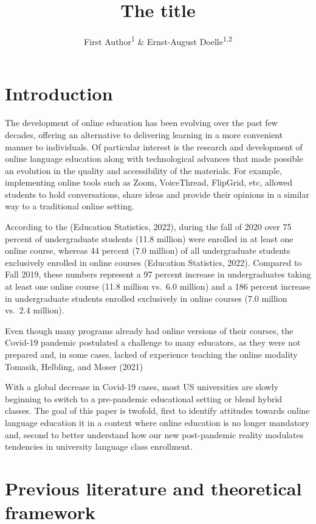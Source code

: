 \documentclass[
  man]{apa6}
\title{The title}
\author{First Author\textsuperscript{1} \& Ernst-August Doelle\textsuperscript{1,2}}
\date{}
\affiliation{\vspace{0.5cm}\textsuperscript{1} Wilhelm-Wundt-University\\\textsuperscript{2} Konstanz Business School}
\begin{document}
\maketitle

\hypertarget{introduction}{%
\section{Introduction}\label{introduction}}

The development of online education has been evolving over the past few decades, offering an alternative to delivering learning in a more convenient manner to individuals.
Of particular interest is the research and development of online language education along with technological advances that made possible an evolution in the quality and accessibility of the materials.
For example, implementing online tools such as Zoom, VoiceThread, FlipGrid, etc, allowed students to hold conversations, share ideas and provide their opinions in a similar way to a traditional online setting.

According to the (Education Statistics, 2022), during the fall of 2020 over 75 percent of undergraduate students (11.8 million) were enrolled in at least one online course, whereas 44 percent (7.0 million) of all undergraduate students exclusively enrolled in online courses (Education Statistics, 2022).
Compared to Fall 2019, these numbers represent a 97 percent increase in undergraduates taking at least one online course (11.8 million vs.~6.0 million) and a 186 percent increase in undergraduate students enrolled exclusively in online courses (7.0 million vs.~2.4 million).

Even though many programs already had online versions of their courses, the Covid-19 pandemic postulated a challenge to many educators, as they were not prepared and, in some cases, lacked of experience teaching the online modality Tomasik, Helbling, and Moser (2021)

With a global decrease in Covid-19 cases, most US universities are slowly beginning to switch to a pre-pandemic educational setting or blend hybrid classes.
The goal of this paper is twofold, first to identify attitudes towards online language education it in a context where online education is no longer mandatory and, second to better understand how our new post-pandemic reality modulates tendencies in university language class enrollment.

\newpage

\hypertarget{previous-literature-and-theoretical-framework}{%
\section{Previous literature and theoretical framework}\label{previous-literature-and-theoretical-framework}}
\end{document}
